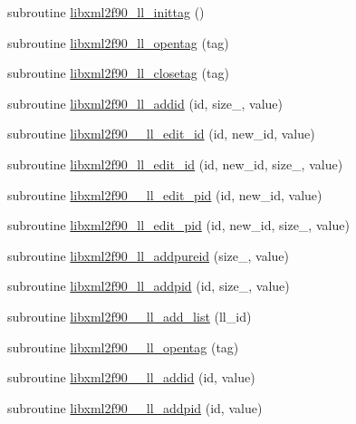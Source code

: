 \begin{DoxyCompactItemize}
\item 
subroutine \hyperlink{libxml2f90_8f90__pp_8f90_a9ffe2ce74c95d1e444dd17c02cf7ca19}{libxml2f90\+\_\+ll\+\_\+inittag} ()
\item 
subroutine \hyperlink{libxml2f90_8f90__pp_8f90_a102819b1160e7cccf698c60979acaef5}{libxml2f90\+\_\+ll\+\_\+opentag} (tag)
\item 
subroutine \hyperlink{libxml2f90_8f90__pp_8f90_a23bfc785d957e044414ea18be75ac87a}{libxml2f90\+\_\+ll\+\_\+closetag} (tag)
\item 
subroutine \hyperlink{libxml2f90_8f90__pp_8f90_aedf302b29e22ba3b7312a7650ac0134b}{libxml2f90\+\_\+ll\+\_\+addid} (id, size\+\_\+, value)
\item 
subroutine \hyperlink{libxml2f90_8f90__pp_8f90_a3c214cdd6b674131bd309980b862b11d}{libxml2f90\+\_\+\+\_\+ll\+\_\+edit\+\_\+id} (id, new\+\_\+id, value)
\item 
subroutine \hyperlink{libxml2f90_8f90__pp_8f90_a69526b5264bc6d6f141bc8a9b0c7cc77}{libxml2f90\+\_\+ll\+\_\+edit\+\_\+id} (id, new\+\_\+id, size\+\_\+, value)
\item 
subroutine \hyperlink{libxml2f90_8f90__pp_8f90_a7170975a9d7aeb275e0c6b9c7c809ead}{libxml2f90\+\_\+\+\_\+ll\+\_\+edit\+\_\+pid} (id, new\+\_\+id, value)
\item 
subroutine \hyperlink{libxml2f90_8f90__pp_8f90_aa49d7ebdfc709eed8ffaaae8f0b58d9b}{libxml2f90\+\_\+ll\+\_\+edit\+\_\+pid} (id, new\+\_\+id, size\+\_\+, value)
\item 
subroutine \hyperlink{libxml2f90_8f90__pp_8f90_a339be1907542e3618239cb185bd5c386}{libxml2f90\+\_\+ll\+\_\+addpureid} (size\+\_\+, value)
\item 
subroutine \hyperlink{libxml2f90_8f90__pp_8f90_a844ec38349c1e4d4537237258b453eda}{libxml2f90\+\_\+ll\+\_\+addpid} (id, size\+\_\+, value)
\item 
subroutine \hyperlink{libxml2f90_8f90__pp_8f90_a9f50298bda8735c41959e4e4275d97bd}{libxml2f90\+\_\+\+\_\+ll\+\_\+add\+\_\+list} (ll\+\_\+id)
\item 
subroutine \hyperlink{libxml2f90_8f90__pp_8f90_a113f047d3ac5fe6e1573d1c123afbd87}{libxml2f90\+\_\+\+\_\+ll\+\_\+opentag} (tag)
\item 
subroutine \hyperlink{libxml2f90_8f90__pp_8f90_ab78ccc23aca850d7f57e4cbb417fa8a3}{libxml2f90\+\_\+\+\_\+ll\+\_\+addid} (id, value)
\item 
subroutine \hyperlink{libxml2f90_8f90__pp_8f90_a27b88f71526165bff7aec413fad71028}{libxml2f90\+\_\+\+\_\+ll\+\_\+addpid} (id, value)
\item 

\end{DoxyCompactItemize}
